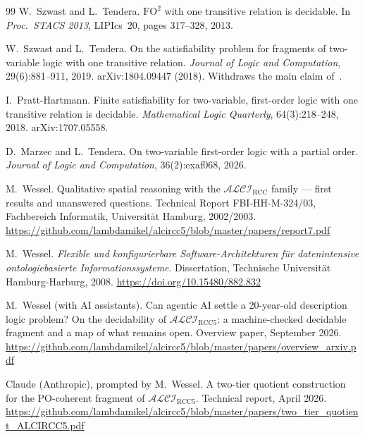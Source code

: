 \documentclass[11pt]{article}
\newcommand{\ALCIRCC}[1]{\mathcal{ALCI}_{\mathrm{RCC#1}}}
\theoremstyle{plain}
\theoremstyle{definition}
\begin{document}
\begin{thebibliography}{99}
W.\ Szwast and L.\ Tendera.
\newblock $\mathrm{FO}^2$ with one transitive relation is decidable.
\newblock In \emph{Proc.\ STACS 2013}, LIPIcs~20, pages 317--328, 2013.

W.\ Szwast and L.\ Tendera.
\newblock On the satisfiability problem for fragments of two-variable logic
  with one transitive relation.
\newblock \emph{Journal of Logic and Computation}, 29(6):881--911, 2019.
  arXiv:1804.09447 (2018). Withdraws the main claim
  of~\cite{SzwastTendera2013}.

I.\ Pratt-Hartmann.
\newblock Finite satisfiability for two-variable, first-order logic with one
  transitive relation is decidable.
\newblock \emph{Mathematical Logic Quarterly}, 64(3):218--248, 2018.
  arXiv:1707.05558.

D.\ Marzec and L.\ Tendera.
\newblock On two-variable first-order logic with a partial order.
\newblock \emph{Journal of Logic and Computation}, 36(2):exaf068, 2026.

M.\ Wessel.
\newblock Qualitative spatial reasoning with the $\ALCIRCC{}$ family ---
  first results and unanswered questions.
\newblock Technical Report FBI-HH-M-324/03, Fachbereich Informatik,
  Universit\"at Hamburg, 2002/2003.
\newblock \url{https://github.com/lambdamikel/alcircc5/blob/master/papers/report7.pdf}

M.\ Wessel.
\newblock \emph{Flexible und konfigurierbare Software-Architekturen f\"ur
  datenintensive ontologiebasierte Informationssysteme}.
\newblock Dissertation, Technische Universit\"at Hamburg-Harburg, 2008.
\newblock \url{https://doi.org/10.15480/882.832}


M.\ Wessel (with AI assistants).
\newblock Can agentic AI settle a 20-year-old description logic problem? On the
  decidability of $\ALCIRCC{5}$: a machine-checked decidable fragment and a map
  of what remains open.
\newblock Overview paper, September 2026.
\newblock \url{https://github.com/lambdamikel/alcircc5/blob/master/papers/overview_arxiv.pdf}

Claude (Anthropic), prompted by M.\ Wessel.
\newblock A two-tier quotient construction for the PO-coherent fragment of
  $\ALCIRCC{5}$.
\newblock Technical report, April 2026.
\newblock \url{https://github.com/lambdamikel/alcircc5/blob/master/papers/two_tier_quotient_ALCIRCC5.pdf}


\end{thebibliography}
\end{document}
